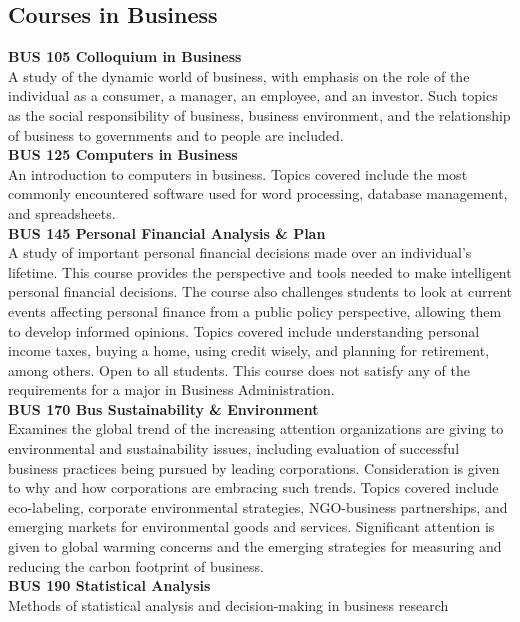 \documentclass[
  letterpaper,
]{scrbook}
\begin{document}
\subsection{Courses in Business}\label{courses-in-business}

\textbf{BUS 105 Colloquium in Business}\\
A study of the dynamic world of business, with emphasis on the role of
the individual as a consumer, a manager, an employee, and an investor.
Such topics as the social responsibility of business, business
environment, and the relationship of business to governments and to
people are included.\\
\textbf{BUS 125 Computers in Business}\\
An introduction to computers in business. Topics covered include the
most commonly encountered software used for word processing, database
management, and spreadsheets.\\
\textbf{BUS 145 Personal Financial Analysis \& Plan}\\
A study of important personal financial decisions made over an
individual's lifetime. This course provides the perspective and tools
needed to make intelligent personal financial decisions. The course also
challenges students to look at current events affecting personal finance
from a public policy perspective, allowing them to develop informed
opinions. Topics covered include understanding personal income taxes,
buying a home, using credit wisely, and planning for retirement, among
others. Open to all students. This course does not satisfy any of the
requirements for a major in Business Administration.\\
\textbf{BUS 170 Bus Sustainability \& Environment}\\
Examines the global trend of the increasing attention organizations are
giving to environmental and sustainability issues, including evaluation
of successful business practices being pursued by leading corporations.
Consideration is given to why and how corporations are embracing such
trends. Topics covered include eco-labeling, corporate environmental
strategies, NGO-business partnerships, and emerging markets for
environmental goods and services. Significant attention is given to
global warming concerns and the emerging strategies for measuring and
reducing the carbon footprint of business.\\
\textbf{BUS 190 Statistical Analysis}\\
Methods of statistical analysis and decision-making in business research
\end{document}
